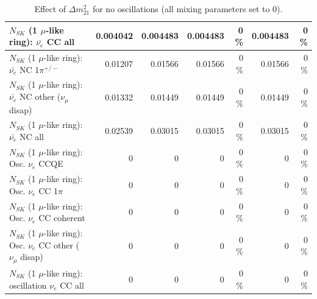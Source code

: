 \begin{table}
\begin{tabular}{| l | r | r | r  r | r  r |}
                            $N_{SK}$ (1 $\mu$-like ring): $\bar{\nu_{e}}$ CC all &        0.004042 &        0.004483 &        0.004483 &        0 \%  &        0.004483 &        0 \%  \\ 
\hline
                     $N_{SK}$ (1 $\mu$-like ring): $\bar{\nu_e}$ NC 1$\pi^{+/-}$ &         0.01207 &         0.01566 &         0.01566 &        0 \%  &         0.01566 &        0 \%  \\ 
          $N_{SK}$ (1 $\mu$-like ring): $\bar{\nu_e}$ NC other ($\nu_\mu$ disap) &         0.01332 &         0.01449 &         0.01449 &        0 \%  &         0.01449 &        0 \%  \\ 
                            $N_{SK}$ (1 $\mu$-like ring): $\bar{\nu_{e}}$ NC all &         0.02539 &         0.03015 &         0.03015 &        0 \%  &         0.03015 &        0 \%  \\ 
\hline
\hline
\hline
                                 $N_{SK}$ (1 $\mu$-like ring): Osc. $\nu_e$ CCQE &               0 &               0 &               0 &        0 \%  &               0 &        0 \%  \\ 
                            $N_{SK}$ (1 $\mu$-like ring): Osc. $\nu_e$ CC 1$\pi$ &               0 &               0 &               0 &        0 \%  &               0 &        0 \%  \\ 
                          $N_{SK}$ (1 $\mu$-like ring): Osc. $\nu_e$ CC coherent &               0 &               0 &               0 &        0 \%  &               0 &        0 \%  \\ 
           $N_{SK}$ (1 $\mu$-like ring): Osc. $\nu_e$ CC other ($\nu_\mu$ disap) &               0 &               0 &               0 &        0 \%  &               0 &        0 \%  \\ 
                        $N_{SK}$ (1 $\mu$-like ring): oscillation $\nu_e$ CC all &               0 &               0 &               0 &        0 \%  &               0 &        0 \%  \\ 
\hline
\hline
\end{tabular}
\caption{ Effect of $\Delta m^2_{21}$ for no oscillations (all mixing parameters set to 0). }
\label{tab:num_dm12sq_1RmuT_3f_osc_t13:0}
\end{table}
\clearpage
